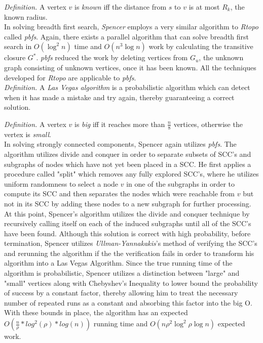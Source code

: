 \documentclass[paper=a4, fontsize=11pt]{scrartcl} %
\numberwithin{equation}{section} %
\numberwithin{figure}{section} %
\numberwithin{table}{section} %
\begin{document}
\textit{Definition.} A vertex $v$ is \textit{known} iff the distance from $s$ to $v$ is at most $R_k$, the known radius.\\

In solving breadth first search, \textit{Spencer\cite{S97}} employs a very similar algorithm to \textit{Rtopo} called \textit{pbfs}. Again, there exists a parallel algorithm that can solve breadth first search in $O(\log^2{n})$ time and $O(n^3\log{n})$ work by calculating the transitive closure $G^*$. \textit{pbfs} reduced the work by deleting vertices from $G_u$, the unknown graph consisting of unknown vertices, once it has been known. All the techniques developed for \textit{Rtopo} are applicable to \textit{pbfs}. \\ 

\textit{Definition.} A \textit{Las Vegas algorithm} is a probabilistic algorithm which can detect when it has made a mistake and try again, thereby guaranteeing a correct solution.

\textit{Definition.} A vertex $v$ is \textit{big} iff it reaches more than \textit{$\frac{n}{8}$} vertices, otherwise the vertex is \textit{small}.\\ 

In solving strongly connected components, Spencer again utilizes \textit{pbfs}. The algorithm utilizes divide and conquer in order to separate subsets of SCC's and subgraphs of nodes which have not yet been placed in a SCC. He first applies a procedure called "split" which removes any fully explored SCC's, where he utilizes uniform randomness to select a node $v$ in one of the subgraphs in order to compute its SCC and then separates the nodes which were reachable from $v$ but not in its SCC by adding these nodes to a new subgraph for further processing. At this point, Spencer's algorithm utilizes the divide and conquer technique by recursively calling itself on each of the induced subgraphs until all of the SCC's have been found. Although this solution is correct with high probability, before termination, Spencer utilizes \textit{Ullman-Yannakakis\cite{UY91}}'s method of verifying the SCC's and rerunning the algorithm if the the verification fails in order to transform his algorithm into a Las Vegas Algorithm. Since the true running time of the algorithm is probabilistic, Spencer utilizes a distinction between "large" and "small" vertices along with Chebyshev's Inequality to lower bound the probability of success by a constant factor, thereby allowing him to treat the necessary number of repeated runs as a constant and absorbing this factor into the big O. With these bounds in place, the algorithm has an expected $O(\frac{n}{\rho}*log^2(\rho)*log(n))$ running time and $O(n\rho^2\log^2{\rho}\log{n})$ expected work.  \\ 
\end{document}
